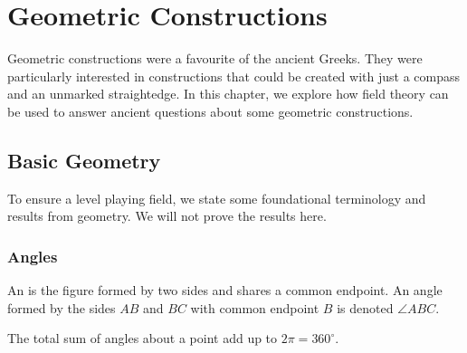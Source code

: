 \newcommand{\constructionproof}[6][0.7\textwidth]{
    \vspace{0.1cm}
    \begin{proof}[Construction]
        \renewcommand{\qedsymbol}{}
        \renewcommand\windowpagestuff{#3}
        \opencutright
        \begin{cutout}{0}{#1}{0pt}{#2}
                #4
        \end{cutout}
    \end{proof}
    \textbf{Claim}. {#5}
    \begin{proof}
        #6
    \end{proof}
}

\newcommand{\Con}{\mathfrak{C}}  %
\newcommand{\con}{\mathcal{C}}  %

\chapter{Geometric Constructions}
Geometric constructions were a favourite of the ancient Greeks. They were particularly interested in constructions that could be created with just a compass and an unmarked straightedge. In this chapter, we explore how field theory can be used to answer ancient questions about some geometric constructions.

\section{Basic Geometry}
To ensure a level playing field, we state some foundational terminology and results from geometry. We will not prove the results here.

\subsection{Angles}
\begin{definition}
    An  is the figure formed by two sides and shares a common endpoint. An angle formed by the sides $AB$ and $BC$ with common endpoint $B$ is denoted $\angle ABC$.
\end{definition}

\begin{definition}
    The total sum of angles about a point add up to $2\pi = 360^\circ$.
\end{definition}


